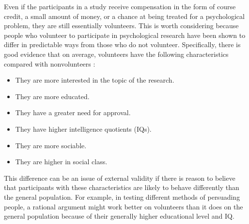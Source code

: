 \color{fgcolor}\begin{kframe}


Even if the participants in a study receive compensation in the form of course credit, a small amount of money, or a chance at being treated for a psychological problem, they are still essentially volunteers. This is worth considering because people who volunteer to participate in psychological research have been shown to differ in predictable ways from those who do not volunteer. Specifically, there is good evidence that on average, volunteers have the following characteristics compared with nonvolunteers \citep{rosenthal_volunteer_1975}:
 

\begin{itemize}
\item They are more interested in the topic of the research.
\item They are more educated.
\item They have a greater need for approval.
\item They have higher intelligence quotients (IQs).
\item They are more sociable.
\item They are higher in social class.
\end{itemize}

This difference can be an issue of external validity if there is reason to believe that participants with these characteristics are likely to behave differently than the general population. For example, in testing different methods of persuading people, a rational argument might work better on volunteers than it does on the general population because of their generally higher educational level and IQ.

\end{kframe}

